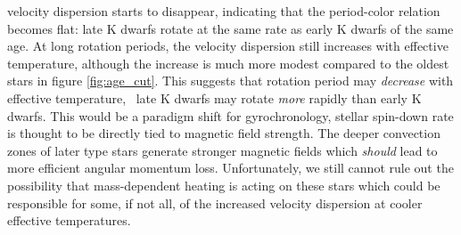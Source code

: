 velocity dispersion starts to disappear, indicating that the period-color
relation becomes flat: late K dwarfs rotate at the same rate as early K dwarfs
of the same age.
At long rotation periods, the velocity dispersion still increases with
effective temperature, although the increase is much more modest compared to
the oldest stars in figure \ref{fig:age_cut}.
This suggests that rotation period may {\it decrease} with effective
temperature, \ie\ late K dwarfs may rotate {\it more} rapidly than early K
dwarfs.
This would be a paradigm shift for gyrochronology, stellar spin-down rate is
thought to be directly tied to magnetic field strength.
The deeper convection zones of later type stars generate stronger magnetic
fields which {\it should} lead to more efficient angular momentum loss.
Unfortunately, we still cannot rule out the possibility that mass-dependent
heating is acting on these stars which could be responsible for some, if not
all, of the increased velocity dispersion at cooler effective temperatures.
